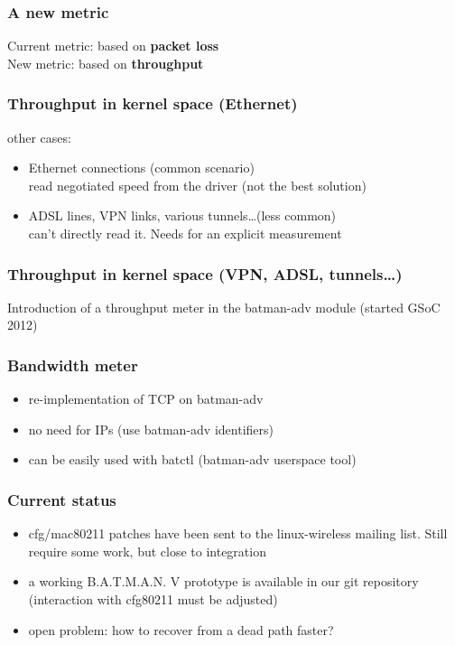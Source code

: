 \documentclass[slidestop]{beamer}
\begin{document}
\begin{frame}[c]
	\frametitle{A new metric}
	\begin{center}
		Current metric: based on \textbf{packet loss}\\
		\pause
		New metric: based on \textbf{throughput}\\
	\end{center}
\end{frame}

\begin{frame}[c]
	\frametitle{Throughput in kernel space (Ethernet)}
	other cases:
	\begin{itemize}
		\item Ethernet connections (common scenario)\\
			read negotiated speed from the driver (not the best
			solution)
		\pause
		\item ADSL lines, VPN links, various tunnels\dots (less
			common)\\
			can't directly read it. Needs for an explicit
			measurement
	\end{itemize}
\end{frame}

\begin{frame}[c]
	\frametitle{Throughput in kernel space (VPN, ADSL, tunnels\dots)}
	Introduction of a throughput meter in the batman-adv module (started
	GSoC 2012)
\end{frame}

\begin{frame}[c]
	\frametitle{Bandwidth meter}
	\begin{itemize}
		\item re-implementation of TCP on batman-adv
		\item no need for IPs (use batman-adv identifiers)
		\item can be easily used with batctl (batman-adv userspace tool)
	\end{itemize}
\end{frame}

\begin{frame}[c]
	\frametitle{Current status}
	\begin{itemize}
		\item cfg/mac80211 patches have been sent to the linux-wireless
			mailing list. Still require some work, but close to
			integration
		\item a working B.A.T.M.A.N. V prototype is available in our git
			repository (interaction with cfg80211 must be adjusted)
		\item open problem: how to recover from a dead path faster?
	\end{itemize}
\end{frame}
\end{document}
